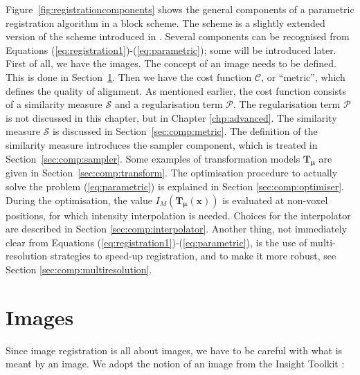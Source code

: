 \documentclass[]{report}
\newcommand{\vx}{\bm{x}}
\newcommand{\vmu}{\bm{\mu}}
\newcommand{\vT}{\bm{T}}
\newcommand{\CC}{\mathcal{C}}
\newcommand{\Sim}{\mathcal{S}}
\newcommand{\Pen}{\mathcal{P}}
\begin{document}
Figure~\ref{fig:registrationcomponents} shows the general components
of a parametric registration algorithm in a block scheme. The scheme
is a slightly extended version of the scheme introduced in
\cite{ITKSoftwareGuideSecondEdition}. Several components can be
recognised from Equations
(\ref{eq:registration1})-(\ref{eq:parametric}); some will be
introduced later. First of all, we have the images. The concept of
an image needs to be defined. This is done in
Section~\ref{sec:comp:image}. Then we have the cost function $\CC$,
or ``metric'', which defines the quality of alignment. As mentioned
earlier, the cost function consists of a similarity measure $\Sim$
and a regularisation term $\Pen$. The regularisation term $\Pen$ is
not discussed in this chapter, but in Chapter \ref{chp:advanced}.
The similarity measure $\Sim$ is discussed in
Section~\ref{sec:comp:metric}. The definition of the similarity
measure introduces the sampler component, which is treated in
Section~\ref{sec:comp:sampler}. Some examples of transformation
models $\vT_{\vmu}$ are given in Section~\ref{sec:comp:transform}.
The optimisation procedure to actually solve the problem
(\ref{eq:parametric}) is explained in Section
\ref{sec:comp:optimiser}. During the optimisation, the value
$I_M(\vT_{\vmu}(\vx))$ is evaluated at non-voxel positions, for
which intensity interpolation is needed. Choices for the
interpolator are described in Section \ref{sec:comp:interpolator}.
Another thing, not immediately clear from Equations
(\ref{eq:registration1})-(\ref{eq:parametric}), is the use of
multi-resolution strategies to speed-up registration, and to make it
more robust, see Section \ref{sec:comp:multiresolution}.

\section{Images}\label{sec:comp:image}

Since image registration is all about images, we have to be
careful with what is meant by an image. We adopt the notion of an
image from the Insight Toolkit \citep[p.
40]{ITKSoftwareGuideSecondEdition}:
\end{document}
